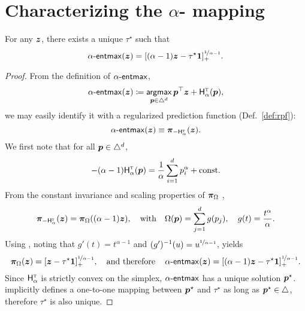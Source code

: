 \section*{Characterizing the {\boldmath $\alpha$-\entmaxtext} mapping}\label{sec:bgform}

\begin{lemma}
    \label{lemma:tsallis_reduction}%
    For any $\bm{z}$, there exists a unique $\tau^\star$ such that
    \begin{equation}\label{eq:entmax_form_app}
        \mathop{\mathsf{\alpha}\textnormal{-}\mathsf{entmax}}(\bm{z})
        = [(\alpha - 1){\bm{z}} - \tau^\star \bm{1}]_+^{\nicefrac{1}{\alpha-1}}.
    \end{equation}
\end{lemma}
\begin{proof}
    From the definition of $\mathop{\mathsf{\alpha}\textnormal{-}\mathsf{entmax}}$,
    \begin{equation}
        \mathop{\mathsf{\alpha}\textnormal{-}\mathsf{entmax}}(\bm{z}) \coloneqq
        \operatorname*{\mathsf{argmax}}_{\bm{p} \in \triangle^d} \bm{p}^\top\bm{z} + \mathsf{H}^{{\textsc{t}}}_{\alpha}(\bm{p}),
    \end{equation}
    we may easily identify it with a regularized prediction function
    (Def.~\ref{def:rpf}):
    \[\mathop{\mathsf{\alpha}\textnormal{-}\mathsf{entmax}}(\bm{z}) \equiv \bm{\pi}_{-\mathsf{H}^{{\textsc{t}}}_{\alpha}}(\bm{z}).\]
    We first note that for all $\bm{p} \in \triangle^d$,
    \begin{equation}
        -(\alpha-1) \mathsf{H}^{{\textsc{t}}}_\alpha(\bm{p}) = \frac{1}{\alpha} \sum_{i=1}^d p_i^\alpha + \text{const}.
    \end{equation}
    From the constant invariance and
    scaling properties of $\bm{\pi}_{\Omega}$
    \citep[Proposition~1, items~4--5]{blondel2019learning},
    \[\bm{\pi}_{-\mathsf{H}^{{\textsc{t}}}_\alpha}(\bm{z})
        = \bm{\pi}_{\Omega}((\alpha - 1)\bm{z}),
        \quad\text{with}\quad
        \Omega(\bm{p}) =
        \sum_{j=1}^{d} g(p_j),
        \quad
        g(t) = \frac{t^\alpha}{\alpha}.
    \]
    Using \citet[Proposition~5]{blondel2019learning}, noting that
    $g'(t) = t^{\alpha - 1}$ and $(g')^{-1}(u) =  u^{\nicefrac{1}{\alpha-1}}$,
    yields
    \begin{equation}\label{eq:rootform}
        \bm{\pi}_{\Omega}(\bm{z}) = [\bm{z} - \tau^\star \bm{1}]_+^{\nicefrac{1}{\alpha-1}},
        \quad\text{and therefore}\quad
        \mathop{\mathsf{\alpha}\textnormal{-}\mathsf{entmax}}(\bm{z}) = [(\alpha-1)\bm{z} - \tau^\star \bm{1}]_+^{\nicefrac{1}{\alpha-1}}.
    \end{equation}
    Since $\mathsf{H}^{{\textsc{t}}}_\alpha$ is strictly convex on the simplex, $\mathop{\mathsf{\alpha}\textnormal{-}\mathsf{entmax}}$ has a unique
    solution $\bm{p}^\star$. 
    implicitly defines a one-to-one mapping between $\bm{p}^\star$ and $\tau^\star$
    as long as $\bm{p}^\star \in \triangle$,
    therefore $\tau^\star$ is also unique.
\end{proof}

